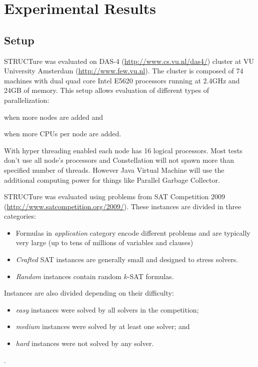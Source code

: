 \chapter{Experimental Results}

\section{Setup}

STRUCTure was evaluated on DAS-4 (\url{http://www.cs.vu.nl/das4/})
cluster at VU University Amsterdam (\url{http://www.few.vu.nl}). The
cluster is composed of 74 machines with dual quad core Intel E5620
processors running at 2.4GHz and 24GB of memory. This setup allows
evaluation of different types of parallelization:
\begin{inparaenum}[1)]
  \item when more nodes are added and
  \item when more CPUs per node are added.
\end{inparaenum}

With hyper threading enabled each node has 16 logical
processors. Most tests don't use all node's processors and
Constellation will not spawn more than specified number of threads.
However Java Virtual Machine will use the additional computing
power for things like Parallel Garbage Collector.

STRUCTure was evaluated using problems from SAT Competition
2009 (\url{http://www.satcompetition.org/2009/}). These instances
are divided in three categories:
\begin{itemize}
  \item Formulas in \emph{application} category encode different
  problems and are typically very large (up to tens of millions
  of variables and clauses)
  \item \emph{Crafted} SAT instances are generally small and
  designed to stress solvers.
  \item \emph{Random} instances contain random $k$-SAT formulas.
\end{itemize}

Instances are also divided depending on their difficulty:
\begin{itemize}
  \item \emph{easy} instances were solved by all solvers in
  the competition;
  \item \emph{medium} instances were solved by at least one solver; and
  \item \emph{hard} instances were not solved by any solver.
\end{itemize}.

